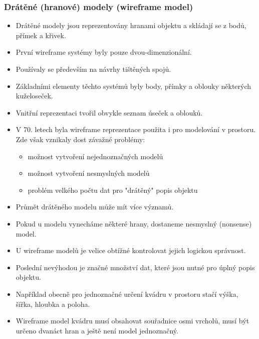 \begin{itemize}
\subsubsection{Drátěné (hranové) modely (wireframe model)}
\begin{itemize}
	\item Drátěné modely jsou reprezentovány hranami objektu a skládají se z bodů, přímek a křivek.
	\item První wireframe systémy byly pouze dvou-dimenzionální.
	\item Používaly se především na návrhy tištěných spojů.
	\item Základními elementy těchto systémů byly body, přímky a oblouky některých kuželoseček.
	\item Vnitřní reprezentaci tvořil obvykle seznam úseček a oblouků.
	\item V 70. letech byla wireframe reprezentace použita i pro modelování v prostoru. Zde však vznikaly dost závažné problémy:
	\begin{itemize}
		\item možnost vytvoření nejednoznačných modelů
		\item možnost vytvoření nesmyslných modelů
		\item problém velkého počtu dat pro "drátěný" popis objektu
	\end{itemize}
	\item Průmět drátěného modelu může mít více významů.
	\item Pokud u modelu vynecháme některé hrany, dostaneme nesmyslný (nonsense) model.
	\item U wireframe modelů je velice obtížné kontrolovat jejich logickou správnost.
	\item Poslední nevýhodou je značné množství dat, které jsou nutné pro úplný popis objektu. 
	\item Například obecně pro jednoznačné určení kvádru v prostoru stačí výška, šířka, hloubka a poloha.
	\item Wireframe model kvádru musí obsahovat souřadnice osmi vrcholů, musí být určeno dvanáct hran a ještě není model jednoznačný.
\end{itemize}


\end{itemize}
